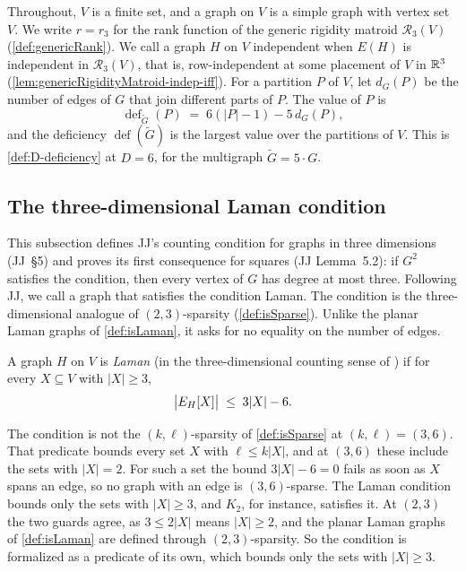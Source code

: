 Throughout, $V$ is a finite set, and a graph on $V$ is a simple graph
with vertex set $V$. We write $r = r_3$ for the rank function of the
generic rigidity matroid $\mathcal{R}_3(V)$ (\cref{def:genericRank}). We
call a graph $H$ on $V$ independent when $E(H)$ is independent in
$\mathcal{R}_3(V)$, that is, row-independent at some placement of $V$ in
$\R^3$ (\cref{lem:genericRigidityMatroid-indep-iff}). For a partition
$P$ of $V$, let $d_G(P)$ be the number of edges of $G$ that join
different parts of $P$. The value of $P$ is
\[
  \operatorname{def}_{\tilde G}(P) \;=\; 6(|P| - 1) - 5\,d_G(P),
\]
and the deficiency $\operatorname{def}(\tilde G)$ is the largest value
over the partitions of $V$. This is \cref{def:D-deficiency} at
$D = 6$, for the multigraph $\tilde G = 5 \cdot G$.

\subsection{The three-dimensional Laman condition}
\label{sec:jacobs-laman3}

This subsection defines JJ's counting condition for graphs in three
dimensions (JJ~\S5) and proves its first consequence for squares (JJ
Lemma~5.2): if $G^2$ satisfies the condition, then every vertex of $G$
has degree at most three. Following JJ, we call a graph that satisfies
the condition Laman. The condition is the three-dimensional analogue of
$(2,3)$-sparsity (\cref{def:isSparse}). Unlike the planar Laman graphs
of \cref{def:isLaman}, it asks for no equality on the number of edges.

\begin{definition}
  \label{def:isLaman3}
  \leanok
  A graph $H$ on $V$ is \emph{Laman} (in the three-dimensional counting
  sense of \cite[\S5]{jacksonJordan2008}) if for every $X \subseteq V$
  with $|X| \ge 3$,
  \[
    \bigl|\edgesIn[H]{X}\bigr| \;\le\; 3|X| - 6 .
  \]
\end{definition}

\begin{fmlnote}
  \label{fmlnote:isLaman3-guard}
  The condition is not the $(k,\ell)$-sparsity of \cref{def:isSparse}
  at $(k, \ell) = (3, 6)$. That predicate bounds every set $X$ with
  $\ell \le k|X|$, and at $(3, 6)$ these include the sets with
  $|X| = 2$. For such a set the bound $3|X| - 6 = 0$ fails as soon as
  $X$ spans an edge, so no graph with an edge is $(3,6)$-sparse. The
  Laman condition bounds only the sets with $|X| \ge 3$, and $K_2$, for
  instance, satisfies it. At $(2, 3)$ the two guards agree, as
  $3 \le 2|X|$ means $|X| \ge 2$, and the planar Laman graphs of
  \cref{def:isLaman} are defined through $(2,3)$-sparsity. So the
  condition is formalized as a predicate of its own, which bounds only
  the sets with $|X| \ge 3$.
\end{fmlnote}

